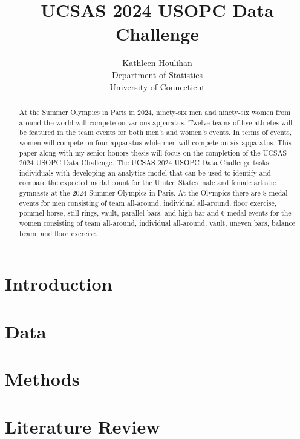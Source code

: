\documentclass[12pt]{article}
\title{UCSAS 2024 USOPC Data Challenge}
\author{Kathleen Houlihan\\
  Department of Statistics\\
  University of Connecticut
}
\begin{document}
\maketitle

\begin{abstract}

  At the Summer Olympics in Paris in 2024, ninety-six men and ninety-six women 
  from around the world will compete on various apparatus. Twelve teams of five athletes will be 
  featured in the team events for both men's and women's events. In terms of events, women
  will compete on four apparatus while men will compete on six apparatus. This paper along 
  with my senior honors thesis will focus on the completion of the UCSAS 2024 USOPC Data Challenge. 
  The UCSAS 2024 USOPC Data Challenge tasks individuals with developing an analytics model that
  can be used to identify and compare the expected medal count for the United States male and 
  female artistic gymnasts at the 2024 Summer Olympics in Paris. At the Olympics there are 8 
  medal events for men consisting of team all-around, individual all-around, floor exercise, 
  pommel horse, still rings, vault, parallel bars, and high bar and 6 medal events for the women 
  consisting of team all-around, individual all-around, vault, uneven bars, balance beam, and 
  floor exercise. 

\end{abstract}

\section{Introduction}
\label{sec:intro}



\section{Data}
\label{sec:data}



\section{Methods}
\label{sec:meth}



\section{Literature Review}
\label{sec:lit}



\begin{thebibliography}{999}

\end{thebibliography}


\end{document}
